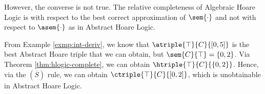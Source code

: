 However, the converse is not true. The relative completeness of Algebraic Hoare
Logic is with respect to the best correct approximation of $\sem{\cdot}$ and not
with respect to $\asem{\cdot}$ as in Abstract Hoare Logic.

\begin{example}
  From Example \ref{exmp:int-deriv}, we know that $\atriple{\top}{C}{[0, 5]}$ is
  the best Abstract Hoare triple that we can obtain, but $\sem{C}{\top} = \{0,
  2\}$. Via Theorem \ref{thm:hlogic-complete}, we can obtain
  $\htriple{\top}{C}{\{0, 2\}}$. Hence, via the $(\overline{S})$ rule, we can
  obtain $\ctriple{\top}{C}{[0, 2]}$, which is unobtainable in Abstract Hoare
  Logic.
\end{example}

